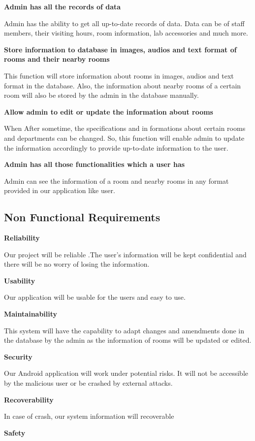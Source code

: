 \textbf{Admin has all the records of data}

Admin has the ability to get all up-to-date records of data. Data can be of staff members, their visiting hours, room information, lab accessories and much more.

\textbf{Store information to database in images, audios and text format of rooms and their nearby rooms}

This function will store information about rooms in images, audios and text format in the database. Also, the information about nearby rooms of a certain room will also be stored by the admin in the database manually.

\textbf{Allow admin to edit or update the information about rooms}

When After sometime, the specifications and in formations about certain rooms and departments can be changed. So, this function will enable admin to update the information accordingly to provide up-to-date information to the user.

\textbf{Admin has all those functionalities which a user has}

Admin can see the information of a room and nearby rooms in any format provided in our application like user.

\subsection{Non Functional Requirements}
\textbf{Reliability}

Our project will be reliable .The user’s information will be kept confidential and there will be no worry of losing the information.

\textbf{Usability}

Our application will be usable for the users and easy to use.

\textbf{Maintainability}

This system will have the capability to adapt changes and amendments done in the database by the admin as the information of rooms will be updated or edited.

\textbf{Security}

Our Android application will work under potential risks. It will not be accessible by the malicious user or be crashed by external attacks.

\textbf{Recoverability}

In case of crash, our system information will recoverable

\textbf{Safety}

